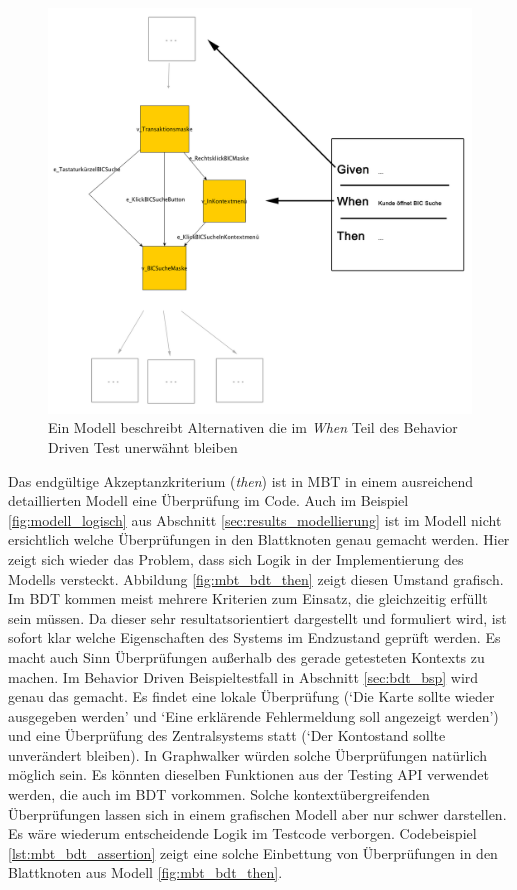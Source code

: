 \begin{figure} 
  \centering
     \includegraphics[width=1\textwidth]{figures/mbt_bdt_when.png}
  \caption{Ein Modell beschreibt Alternativen die im \textit{When} Teil des Behavior Driven Test unerwähnt bleiben}
  \label{fig:mbt_bdt_when}
\end{figure}

Das endgültige Akzeptanzkriterium (\textit{then}) ist in \Gls{MBT} in einem ausreichend detaillierten Modell eine Überprüfung im Code. Auch im Beispiel \ref{fig:modell_logisch} aus Abschnitt \ref{sec:results_modellierung} ist im Modell nicht ersichtlich welche Überprüfungen in den Blattknoten genau gemacht werden. Hier zeigt sich wieder das Problem, dass sich Logik in der Implementierung des Modells versteckt. Abbildung \ref{fig:mbt_bdt_then} zeigt diesen Umstand grafisch. Im \Gls{BDT} kommen meist mehrere Kriterien zum Einsatz, die gleichzeitig erfüllt sein müssen. Da dieser sehr resultatsorientiert dargestellt und formuliert wird, ist sofort klar welche Eigenschaften des Systems im Endzustand geprüft werden. Es macht auch Sinn Überprüfungen außerhalb des gerade getesteten Kontexts zu machen. Im Behavior Driven Beispieltestfall in Abschnitt \ref{sec:bdt_bsp} wird genau das gemacht. Es findet eine lokale Überprüfung (`Die Karte sollte wieder ausgegeben werden' und `Eine erklärende Fehlermeldung soll angezeigt werden') und eine Überprüfung des Zentralsystems statt (`Der Kontostand sollte unverändert bleiben). In Graphwalker würden solche Überprüfungen natürlich möglich sein. Es könnten dieselben Funktionen aus der Testing API verwendet werden, die auch im \Gls{BDT} vorkommen. Solche kontextübergreifenden Überprüfungen lassen sich in einem grafischen Modell aber nur schwer darstellen. Es wäre wiederum entscheidende Logik im Testcode verborgen. Codebeispiel \ref{lst:mbt_bdt_assertion} zeigt eine solche Einbettung von Überprüfungen in den Blattknoten aus Modell \ref{fig:mbt_bdt_then}.


